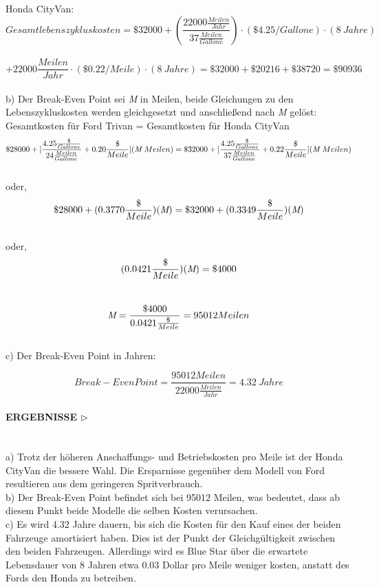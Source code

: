 \documentclass[13pt,titlepage]{article}
\begin{document}
 Honda CityVan:\\
$$ Gesamtlebenszykluskosten = \$32000 +(\frac{22000\frac{Meilen}{Jahr}}{37 \frac{Meilen}{Gallone}}) \cdot (\$4.25/Gallone) \cdot  (8 \ Jahre) $$\\$$+ 22000 \frac{Meilen}{Jahr} \cdot  (\$0.22/Meile) \cdot  (8 \ Jahre) = \$32000 + \$20216 + \$38720 = \$90936$$\\
 
 b) Der Break-Even Point sei \emph{M} in Meilen, beide Gleichungen zu den Lebenszykluskosten werden gleichgesetzt und anschließend nach \emph{M} gel\"ost:\\
 
 Gesamtkosten für Ford Trivan = Gesamtkosten f\"ur Honda CityVan\\
 
 $$ \$28000 +  [ \frac{4.25\frac{\$}{Gallone}}{24\frac{Meilen}{Gallone}} + 0.20\frac{\$}{Meile}](\emph{M} \ Meilen) = \$32000 + [ \frac{4.25\frac{\$}{Gallone}}{37\frac{Meilen}{Gallone}} + 0.22\frac{\$}{Meile}](\emph{M} \ Meilen) $$\\
 oder,\\
 $$ \$28000 + (0.3770\frac{\$}{Meile})(\emph{M}) = \$32000 + (0.3349\frac{\$}{Meile})(\emph{M}) $$\\
 oder,\\
 $$ (0.0421\frac{\$}{Meile})(\emph{M}) = \$4000 $$\\
$$ \emph{M}=\frac{\$4000}{0.0421\frac{\$}{Meile}}=95012 Meilen $$\\

c) Der Break-Even Point in Jahren:

$$ Break-Even Point = \frac{95012 Meilen}{22000\frac{Meilen}{Jahr}} = 4.32 \ Jahre $$

\paragraph{\textbf{ERGEBNISSE} $\triangleright$ }\mbox{}\\


a) Trotz der h\"oheren Anschaffungs- und Betriebskosten pro Meile ist der Honda CityVan die bessere Wahl. Die Ersparnisse gegen\"uber dem Modell von Ford resultieren aus dem geringeren Spritverbrauch.\\

b) Der Break-Even Point befindet sich bei 95012 Meilen, was bedeutet, dass ab diesem Punkt beide Modelle die selben Kosten verursachen.\\

c) Es wird 4.32 Jahre dauern, bis sich die Kosten für den Kauf eines der beiden Fahrzeuge amortisiert haben. Dies ist der Punkt der Gleichgültigkeit zwischen den beiden Fahrzeugen. Allerdings wird es  Blue Star über die erwartete Lebensdauer von 8 Jahren etwa 0.03 Dollar pro Meile weniger kosten, anstatt des Fords den Honda zu betreiben.
\end{document}
